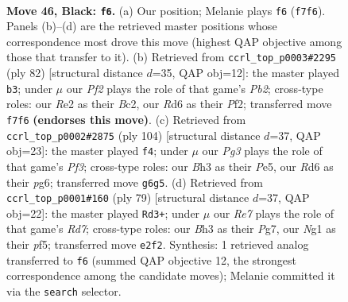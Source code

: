\documentclass[11pt]{article}
\begin{document}
\clearpage

\begin{figure}[p]\centering
\begin{subfigure}{0.46\textwidth}\centering
\resizebox{\linewidth}{!}{%
\newchessgame
\chessboard[
  setfen={8/5p1p/3r2pk/R7/1p2PK2/6Pb/4r3/6n1 b - - 3 46},
  showmover=false,
  pgfstyle=straightmove, color=movearrow, markmove={f7-f6}
]}
\caption{}
\end{subfigure}\hfill
\begin{subfigure}{0.46\textwidth}\centering
\resizebox{\linewidth}{!}{%
\newchessgame
\chessboard[
  setfen={8/6k1/1n4p1/p7/3r4/P3N3/1PB2PPP/5K2 w - - 1 42},
  showmover=false,
  pgfstyle=straightmove, color=movearrow, markmove={b2-b3}
]}
\caption{}
\end{subfigure}
\\[4pt]
\begin{subfigure}{0.46\textwidth}\centering
\resizebox{\linewidth}{!}{%
\newchessgame
\chessboard[
  setfen={5k2/3R1p2/6pp/4P3/r7/5PKP/6P1/8 w - - 8 53},
  showmover=false,
  pgfstyle=straightmove, color=movearrow, markmove={f3-f4}
]}
\caption{}
\end{subfigure}\hfill
\begin{subfigure}{0.46\textwidth}\centering
\resizebox{\linewidth}{!}{%
\newchessgame
\chessboard[
  setfen={8/6pk/5p1p/4pP2/1R6/5K1P/3r1PP1/8 b - - 3 40},
  showmover=false,
  pgfstyle=straightmove, color=movearrow, markmove={d2-d3}
]}
\caption{}
\end{subfigure}
\caption{\textbf{Move 46, Black: \texttt{f6}.} (a) Our position; Melanie plays \texttt{f6} (\texttt{f7f6}). Panels (b)--(d) are the retrieved master positions whose correspondence most drove this move (highest QAP objective among those that transfer to it). (b) Retrieved from \texttt{ccrl\_top\_p0003\#2295} (ply 82) [structural distance $d$=35, QAP obj=12]: the master played \texttt{b3}; under $\mu$ our \emph{Pf2} plays the role of that game's \emph{Pb2}; cross-type roles: our \emph{R}e2 as their \emph{B}c2, our \emph{R}d6 as their \emph{P}f2; transferred move \texttt{f7f6} \textbf{(endorses this move)}. (c) Retrieved from \texttt{ccrl\_top\_p0002\#2875} (ply 104) [structural distance $d$=37, QAP obj=23]: the master played \texttt{f4}; under $\mu$ our \emph{Pg3} plays the role of that game's \emph{Pf3}; cross-type roles: our \emph{B}h3 as their \emph{P}e5, our \emph{R}d6 as their \emph{p}g6; transferred move \texttt{g6g5}. (d) Retrieved from \texttt{ccrl\_top\_p0001\#160} (ply 79) [structural distance $d$=37, QAP obj=22]: the master played \texttt{Rd3+}; under $\mu$ our \emph{Re7} plays the role of that game's \emph{Rd7}; cross-type roles: our \emph{B}h3 as their \emph{P}g7, our \emph{N}g1 as their \emph{p}f5; transferred move \texttt{e2f2}. Synthesis: 1 retrieved analog transferred to \texttt{f6} (summed QAP objective 12, the strongest correspondence among the candidate moves); Melanie committed it via the \texttt{search} selector.}
\label{fig:thought-m91}
\end{figure}
\end{document}
